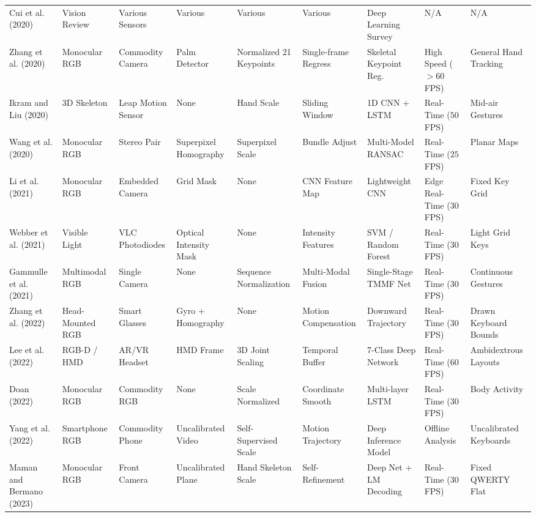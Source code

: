\begin{table}[htbp]
{\begin{tabular}{l l l l l l l l l}
Cui et al. (2020) \cite{Cui2020Deep} & Vision Review & Various Sensors & Various & Various & Various & Deep Learning Survey & N/A & N/A \\
Zhang et al. (2020) \cite{Zhang2020MediaPipe} & Monocular RGB & Commodity Camera & Palm Detector & Normalized 21 Keypoints & Single-frame Regress & Skeletal Keypoint Reg. & High Speed ($> 60$ FPS) & General Hand Tracking \\
Ikram and Liu (2020) \cite{Ikram2020Skeleton} & 3D Skeleton & Leap Motion Sensor & None & Hand Scale & Sliding Window & 1D CNN + LSTM & Real-Time ($50$ FPS) & Mid-air Gestures \\
Wang et al. (2020) \cite{Wang2020Relative} & Monocular RGB & Stereo Pair & Superpixel Homography & Superpixel Scale & Bundle Adjust & Multi-Model RANSAC & Real-Time ($25$ FPS) & Planar Maps \\
Li et al. (2021) \cite{Li2021CNN} & Monocular RGB & Embedded Camera & Grid Mask & None & CNN Feature Map & Lightweight CNN & Edge Real-Time ($30$ FPS) & Fixed Key Grid \\
Webber et al. (2021) \cite{Webber2021Finger} & Visible Light & VLC Photodiodes & Optical Intensity Mask & None & Intensity Features & SVM / Random Forest & Real-Time ($30$ FPS) & Light Grid Keys \\
Gammulle et al. (2021) \cite{Gammulle2021TMMF} & Multimodal RGB & Single Camera & None & Sequence Normalization & Multi-Modal Fusion & Single-Stage TMMF Net & Real-Time ($30$ FPS) & Continuous Gestures \\
Zhang et al. (2022) \cite{Zhang2022DynaKey} & Head-Mounted RGB & Smart Glasses & Gyro + Homography & None & Motion Compensation & Downward Trajectory & Real-Time ($30$ FPS) & Drawn Keyboard Bounds \\
Lee et al. (2022) \cite{Lee2022Virtual} & RGB-D / HMD & AR/VR Headset & HMD Frame & 3D Joint Scaling & Temporal Buffer & 7-Class Deep Network & Real-Time ($60$ FPS) & Ambidextrous Layouts \\
Doan (2022) \cite{Doan2022Efficient} & Monocular RGB & Commodity RGB & None & Scale Normalized & Coordinate Smooth & Multi-layer LSTM & Real-Time ($30$ FPS) & Body Activity \\
Yang et al. (2022) \cite{Yang2022Towards} & Smartphone RGB & Commodity Phone & Uncalibrated Video & Self-Supervised Scale & Motion Trajectory & Deep Inference Model & Offline Analysis & Uncalibrated Keyboards \\
Maman and Bermano (2023) \cite{Maman2023TypeNet} & Monocular RGB & Front Camera & Uncalibrated Plane & Hand Skeleton Scale & Self-Refinement & Deep Net + LM Decoding & Real-Time ($30$ FPS) & Fixed QWERTY Flat \\

\end{tabular}}
\end{table}
